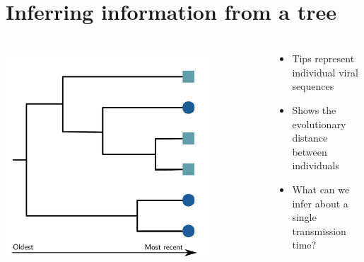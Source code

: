 \documentclass[aspectratio=169]{beamer}
\begin{document}
\begin{frame}
\begin{columns}
    \end{columns}

\end{frame}

\section{Inferring information from a tree}

\begin{frame} \frametitle{\insertsection}

    \begin{columns}

        \begin{column}{0.6\textwidth}
            
            \begin{center}
                \centering\includegraphics[width=0.8\textwidth]{images/tree-blank}
            \end{center}

        \end{column}

        \begin{column}{0.5\textwidth}

            \begin{itemize}
                \item Tips represent individual viral sequences
                \item Shows the evolutionary distance between individuals
                \item What can we infer about a single transmission time?
            \end{itemize}

        \end{column}

    \end{columns}

\end{frame}
\end{document}
